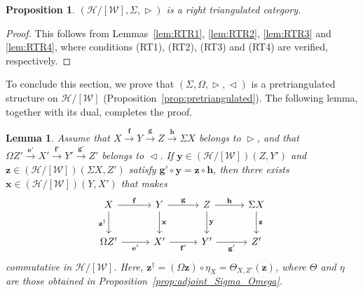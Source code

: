 \documentclass[a4paper,reqno,10pt]{amsart}
\newtheorem{lemma}[lemma]{Lemma}
\newtheorem{proposition}[proposition]{Proposition}
\theoremstyle{definition}
\theoremstyle{definition}
\theoremstyle{definition}
\theoremstyle{definition}
\theoremstyle{plain}
\newcommand{\CH}{\mathcal{H}}
\newcommand{\CW}{\mathcal{W}}
\begin{document}
\begin{proposition}\label{prop:right_triangulated}
$(\CH/[\CW],\Sigma,\vartriangleright)$ is a right triangulated category.
\end{proposition}
\begin{proof}
This follows from Lemmas~\ref{lem:RTR1}, \ref{lem:RTR2}, \ref{lem:RTR3} and \ref{lem:RTR4}, where
conditions {\rm (RT1)}, {\rm (RT2)}, {\rm (RT3)} and {\rm (RT4)}
are verified, respectively.
\end{proof}







To conclude this section, we prove that $(\Sigma,\Omega,\vartriangleright,\vartriangleleft)$ is a pretriangulated structure on $\CH/[\CW]$ (Proposition~\ref{prop:pretriangulated}). The following lemma, together with its dual, completes the proof.
\begin{lemma}\label{lem:PT}
Assume that $X\xrightarrow{\mathbf{f}}Y\xrightarrow{\mathbf{g}}Z\xrightarrow{\mathbf{h}}\Sigma X$
belongs to $\vartriangleright$, and 
\color{blue}
that 
\normalcolor
$\Omega Z'\xrightarrow{\mathbf{e}'}X'\xrightarrow{\mathbf{f}'}Y'\xrightarrow{\mathbf{g}'}Z'
$ 
\color{blue}
belongs 
\normalcolor
to $\vartriangleleft$.
If $\mathbf{y}\in(\CH/[\CW])(Z,Y')$ and $\mathbf{z}\in(\CH/[\CW])(\Sigma X,Z')$ satisfy
$\mathbf{g}'\circ \mathbf{y}=\mathbf{z}\circ \mathbf{h}$, then there exists $\mathbf{x}\in(\CH/[\CW])(Y,X')$
that makes 
\[
\begin{tikzcd}[row sep=0.8cm, column sep=1.0cm]
X\arrow[r, "\mathbf{f}"]
\arrow[d, swap, "\mathbf{z}^{\dagger}" ]
&Y\arrow[r, "\mathbf{g}"]
\arrow[d, "\mathbf{x}"]
&Z \arrow[r, "\mathbf{h}"]
\arrow[d, "\mathbf{y}"]
&\Sigma X
\arrow[d, "\mathbf{z}"]
\\
\Omega Z'\arrow[r, swap, "\mathbf{e}'"]
&X'\arrow[r, swap, "\mathbf{f}'"]
&Y' \arrow[r, swap, "\mathbf{g}'"]
&Z'
\end{tikzcd}
\]
commutative in $\CH/[\CW]$. Here, 
$\mathbf{z}^{\dagger}=(\Omega\mathbf{z})\circ\eta_X=\Theta_{X,Z'}(\mathbf{z})$, where $\Theta$ and $\eta$ are those %
obtained in Proposition~\ref{prop:adjoint_Sigma_Omega}.
\normalcolor

\end{lemma}
\end{document}
